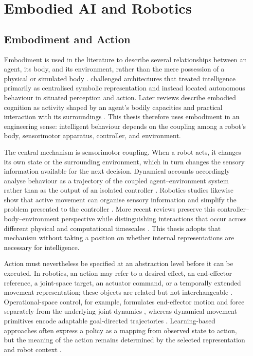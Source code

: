 \section{Embodied AI and Robotics}
\label{sec:embodied-ai-robotics}

\subsection{Embodiment and Action}
\label{sec:embodiment-action}

Embodiment is used in the literature to describe several relationships between
an agent, its body, and its environment, rather than the mere possession of a
physical or simulated body \citep{ziemke2003embodiment}.
\citet{brooks1991intelligence} challenged architectures that treated
intelligence primarily as centralised symbolic representation and instead
located autonomous behaviour in situated perception and action. Later reviews
describe embodied cognition as activity shaped by an agent's bodily capacities
and practical interaction with its surroundings
\citep{anderson2003fieldguide}. This thesis therefore uses embodiment in an
engineering sense: intelligent behaviour depends on the coupling among a
robot's body, sensorimotor apparatus, controller, and environment.

The central mechanism is sensorimotor coupling. When a robot acts, it changes
its own state or the surrounding environment, which in turn changes the sensory
information available for the next decision. Dynamical accounts accordingly
analyse behaviour as a trajectory of the coupled agent--environment system
rather than as the output of an isolated controller
\citep{beer1995dynamical}. Robotics studies likewise show that active movement
can organise sensory information and simplify the problem presented to the
controller \citep{pfeifer1997sensorymotor}. More recent reviews preserve this
controller--body--environment perspective while distinguishing interactions
that occur across different physical and computational timescales
\citep{iida2023timescales}. This thesis adopts that mechanism without taking a
position on whether internal representations are necessary for intelligence.

Action must nevertheless be specified at an abstraction level before it can be
executed. In robotics, an action may refer to a desired effect, an end-effector
reference, a joint-space target, an actuator command, or a temporally extended
movement representation; these objects are related but not interchangeable
\citep{zech2019action}. Operational-space control, for example, formulates
end-effector motion and force separately from the underlying joint dynamics
\citep{khatib1987unified}, whereas dynamical movement primitives encode
adaptable goal-directed trajectories \citep{ijspeert2013dmp}. Learning-based
approaches often express a policy as a mapping from observed state to action,
but the meaning of the action remains determined by the selected representation
and robot context \citep{argall2009survey,kober2013reinforcement}.

